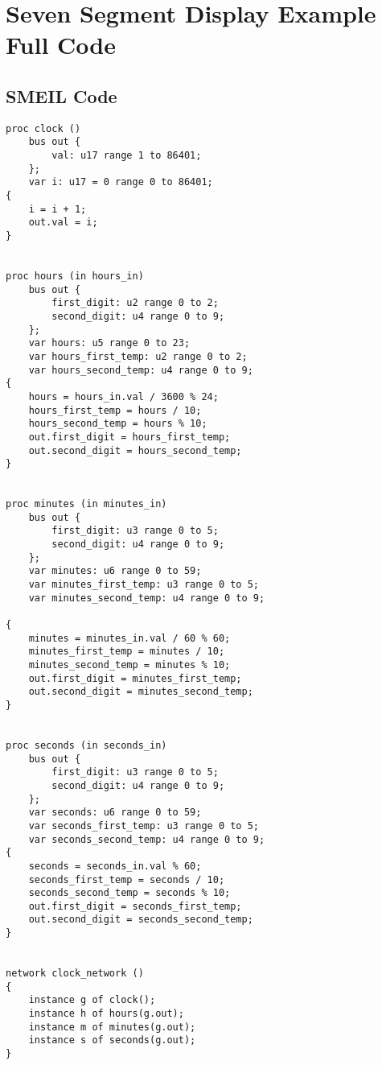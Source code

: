 \chapter{Seven Segment Display Example Full Code}
\label{app:seven_segments}
\section*{SMEIL Code}
\begin{verbatim}
proc clock ()
    bus out {
        val: u17 range 1 to 86401;
    };
    var i: u17 = 0 range 0 to 86401;
{
    i = i + 1;
    out.val = i;
}


proc hours (in hours_in)
    bus out {
        first_digit: u2 range 0 to 2;
        second_digit: u4 range 0 to 9;
    };
    var hours: u5 range 0 to 23;
    var hours_first_temp: u2 range 0 to 2;
    var hours_second_temp: u4 range 0 to 9;
{
    hours = hours_in.val / 3600 % 24;
    hours_first_temp = hours / 10;
    hours_second_temp = hours % 10;
    out.first_digit = hours_first_temp;
    out.second_digit = hours_second_temp;
}


proc minutes (in minutes_in)
    bus out {
        first_digit: u3 range 0 to 5;
        second_digit: u4 range 0 to 9;
    };
    var minutes: u6 range 0 to 59;
    var minutes_first_temp: u3 range 0 to 5;
    var minutes_second_temp: u4 range 0 to 9;

{
    minutes = minutes_in.val / 60 % 60;
    minutes_first_temp = minutes / 10;
    minutes_second_temp = minutes % 10;
    out.first_digit = minutes_first_temp;
    out.second_digit = minutes_second_temp;
}


proc seconds (in seconds_in)
    bus out {
        first_digit: u3 range 0 to 5;
        second_digit: u4 range 0 to 9;
    };
    var seconds: u6 range 0 to 59;
    var seconds_first_temp: u3 range 0 to 5;
    var seconds_second_temp: u4 range 0 to 9;
{
    seconds = seconds_in.val % 60;
    seconds_first_temp = seconds / 10;
    seconds_second_temp = seconds % 10;
    out.first_digit = seconds_first_temp;
    out.second_digit = seconds_second_temp;
}


network clock_network ()
{
    instance g of clock();
    instance h of hours(g.out);
    instance m of minutes(g.out);
    instance s of seconds(g.out);
}

\end{verbatim}

